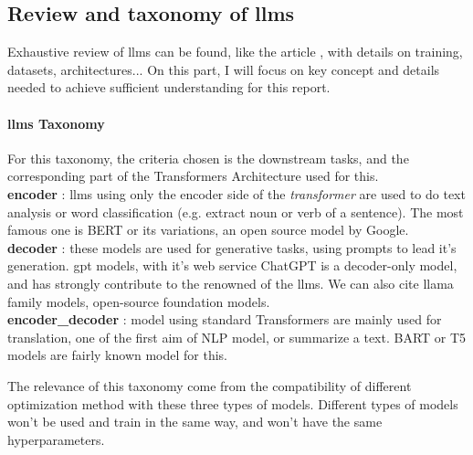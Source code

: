 \subsection{Review and taxonomy of \glspl{llm}}
\label{sec:llm_review}
Exhaustive review of \glspl{llm} can be found, like the article \cite{raiaan_review_2024}, with details on training, datasets, architectures... On this part, I will focus on key concept and details needed to achieve sufficient understanding for this report.

\paragraph{\glspl{llm} Taxonomy}
For this taxonomy, the criteria chosen is the downstream tasks, and the corresponding part of the Transformers Architecture used for this.\\
\textbf{\Gls{encoder}} : \glspl{llm} using only the encoder side of the \textit{\gls{transformer}} are used to do text analysis or word classification (e.g. extract noun or verb of a sentence). The most famous one is BERT\cite{devlin_bert_2019} or its variations, an open source model by Google.\\
\textbf{\Gls{decoder}} : these models are used for generative tasks, using prompts to lead it's generation. \acrfull{gpt} models, with it's web service ChatGPT \cite{openai_gpt-4_2024} is a decoder-only model, and has strongly contribute to the renowned of the \glspl{llm}. We can also cite \gls{llama} \cite{grattafiori_llama_2024} family models, open-source foundation models.\\
\textbf{\Gls{encoder_decoder}} : model using standard Transformers are mainly used for translation, one of the first aim of NLP model, or summarize a text. BART\cite{lewis_bart_2020} or T5\cite{raffel_exploring_2020} models are fairly known model for this.

The relevance of this taxonomy come from the compatibility of different optimization method with these three types of models. Different types of models won't be used and train in the same way, and won't have the same \glspl{hyperparameter}. 

